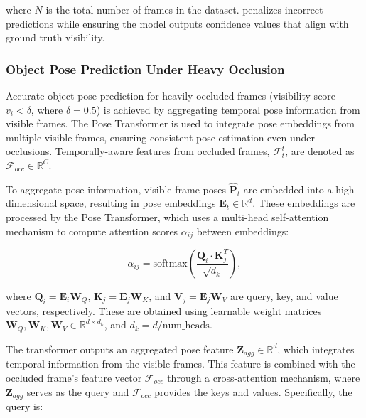 \noindent where $N$ is the total number of frames in the dataset. \DIFdelbegin {}\DIFdelend \DIFaddbegin {}\DIFaddend penalizes incorrect predictions while ensuring the model outputs confidence values that align with \DIFaddbegin {}\DIFaddend ground truth visibility. \DIFaddbegin {}\DIFaddend 

\subsubsection{Object Pose Prediction Under Heavy Occlusion}

Accurate object pose prediction for heavily occluded frames (visibility score $v_i < \delta$, where $\delta = 0.5$) is achieved by aggregating temporal pose information from visible frames. The Pose Transformer is used to integrate pose embeddings from multiple visible frames, ensuring consistent pose estimation even under occlusions. Temporally-aware features from occluded frames, $\mathcal{F}^t_t$, are denoted as $\mathcal{F}_{occ} \in \mathbb{R}^C$.

To aggregate pose information, visible-frame poses $\hat{\mathbf{P}}_t$ are embedded into a high-dimensional space, resulting in pose embeddings $\mathbf{E}_t \in \mathbb{R}^d$. These embeddings are processed by the Pose Transformer, which uses a multi-head self-attention mechanism to compute attention scores $\alpha_{ij}$ between embeddings:

\begin{equation}
\alpha_{ij} = \text{softmax}\left(\frac{\mathbf{Q}_i \cdot \mathbf{K}_j^T}{\sqrt{d_k}}\right),
\end{equation}

\noindent where $\mathbf{Q}_i = \mathbf{E}_i \mathbf{W}_Q$, $\mathbf{K}_j = \mathbf{E}_j \mathbf{W}_K$, and $\mathbf{V}_j = \mathbf{E}_j \mathbf{W}_V$ are query, key, and value vectors, respectively. These are obtained using learnable weight matrices $\mathbf{W}_Q, \mathbf{W}_K, \mathbf{W}_V \in \mathbb{R}^{d \times d_k}$, and $d_k = d / \text{num\_heads}$.

The transformer outputs an aggregated pose feature $\mathbf{Z}_{agg} \in \mathbb{R}^d$, which integrates temporal information from the visible frames. This feature is combined with the occluded frame's feature vector $\mathcal{F}_{occ}$ through a cross-attention mechanism, where $\mathbf{Z}_{agg}$ serves as the query and $\mathcal{F}_{occ}$ provides the keys and values. Specifically, the query is:

